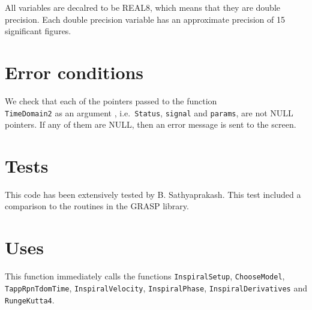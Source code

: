 \documentclass[12pt]{article}
\begin{document}
All variables are decalred to be REAL8, which means that they are double precision.
Each double precision variable has an approximate precision of 15 significant figures.


\section{Error conditions}

We check that each of the pointers passed to the function \\ \texttt{TimeDomain2} as an argument , i.e.\ \texttt{Status}, \texttt{signal} and \texttt{params}, are not NULL pointers. If any of them are NULL, then an error message is sent to the screen.


\section{Tests}

This code has been extensively tested by B. Sathyaprakash. This test included a comparison to the routines in the GRASP library.

\section{Uses}

This function immediately calls the functions \texttt{InspiralSetup}, \texttt{ChooseModel}, \texttt{TappRpnTdomTime}, \texttt{InspiralVelocity}, \texttt{InspiralPhase}, \texttt{InspiralDerivatives} and \texttt{RungeKutta4}.
\end{document}
